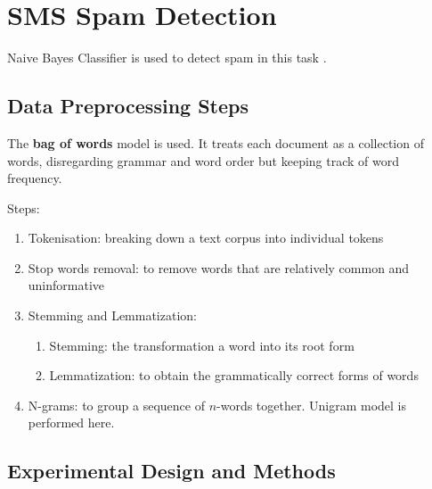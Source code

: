 \section{SMS Spam Detection}

Naive Bayes Classifier is used to detect spam in this task  \cite{raschka2014naive}.

\subsection{Data Preprocessing Steps}

The \textbf{bag of words} model is used. 
It treats each document as a collection of words, disregarding grammar and word order but keeping track of word frequency.

Steps:
\begin{enumerate}
    \item Tokenisation: breaking down a text corpus into individual tokens
    \item Stop words removal: to remove words that are relatively common and uninformative
    \item Stemming and Lemmatization: 
    \begin{enumerate}
        \item Stemming: the transformation a word into its root form
        \item Lemmatization: to obtain the grammatically correct forms of words
    \end{enumerate}
    \item N-grams: to group a sequence of $n$-words together. Unigram model is performed here.
\end{enumerate}




\subsection{Experimental Design and Methods}

